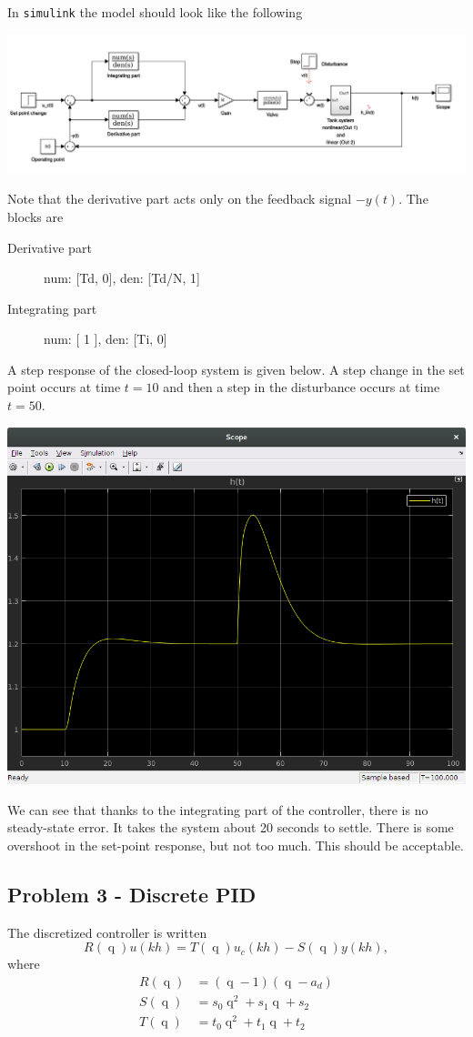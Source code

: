 \documentclass[a4paper]{scrartcl}
\newcommand*{\shift}{\operatorname{q}}
\begin{document}
In \texttt{simulink} the model should look like the following
\begin{center}
\includegraphics[width=0.9\linewidth]{./figures/hw3-pid-block.png}
\end{center}
Note that the derivative part acts only on the feedback signal $-y(t)$. The blocks are
\begin{description}
\item[{Derivative part}] num: [Td, 0], den: [Td/N, 1]
\item[{Integrating part}] num: [ 1 ], den: [Ti, 0]
\end{description}

A step response of the closed-loop system is given below. A step change in the set point occurs at time $t=10$ and then a step in the disturbance occurs at time $t=50$. 
\begin{center}
\includegraphics[width=0.6\linewidth]{./figures/hw3-pid-step.png}
\end{center}

We can see that thanks to the integrating part of the controller, there is no steady-state error. It takes the system about 20 seconds to settle. There is some overshoot in the set-point response, but not too much. This should be acceptable. 

\subsection*{Problem 3 - Discrete PID}
\label{sec-3-3}

The discretized controller is written
\[ R(\shift) u(kh) = T(\shift) u_c(kh) - S(\shift) y(kh), \]
where
\begin{align*}
 R(\shift) &= (\shift -1)(\shift - a_d)\\
 S(\shift) &= s_0\shift^2 + s_1\shift + s_2\\
T(\shift) &= t_0\shift^2 + t_1\shift + t_2
\end{align*}
\end{document}
